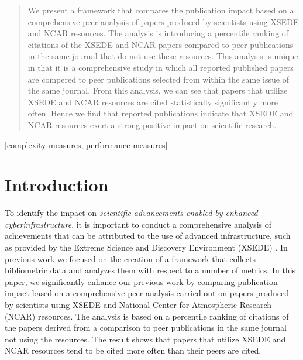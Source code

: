 \documentclass{sig-alternate}
\begin{document}
\begin{abstract}

We present a framework that compares the publication impact based on a comprehensive peer analysis of papers produced by scientists using XSEDE and NCAR resources. The analysis is introducing a percentile ranking of citations of the XSEDE and NCAR papers compared to peer publications in the same journal that do not use these resources.  This analysis is unique in that it is a comprehensive study in which all reported published papers are compered to peer publications selected from within the same issue of the same journal. From this analysis, we can see that papers that utilize XSEDE and NCAR resources are cited statistically significantly more often.  Hence we find that reported publications indicate that XSEDE and NCAR resources exert a strong positive impact on scientific research.

\end{abstract}


\vspace{-6pt}

[complexity measures,
performance measures]




\section{Introduction} 

To identify the impact on {\em scientific advancements enabled by enhanced cyberinfrastructure}, it is important to conduct a comprehensive analysis of achievements that can be attributed to the use of advanced infrastructure, such as provided by the Extreme Science and Discovery Environment (XSEDE) \cite{www-xsede,xsede}. In previous work \cite{las14impact} we focused on the creation of a framework that collects bibliometric data and analyzes them with respect to a number of metrics. In this paper, we significantly enhance our previous work by comparing publication impact based on a comprehensive peer analysis carried out on papers produced by scientists using XSEDE and National Center for Atmospheric Research (NCAR) resources. The analysis is based on a percentile ranking of citations of the papers derived from a comparison to peer publications in the same journal not using the resources. The result shows that papers that utilize XSEDE and NCAR resources tend to be cited more often than their peers are cited.
\end{document}
